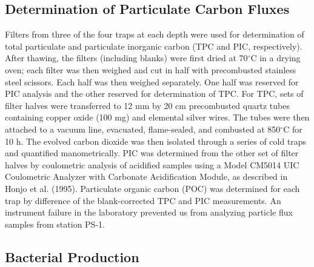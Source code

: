 \subsection{Determination of Particulate Carbon Fluxes}

Filters from three of the four traps at each depth were used for determination of total particulate and particulate inorganic carbon (TPC and PIC, respectively). After thawing, the filters (including blanks) were first dried at 70$^{\circ}$C in a drying oven; each filter was then weighed and cut in half with precombusted stainless steel scissors. Each half was then weighed separately. One half was reserved for PIC analysis and the other reserved for determination of TPC. For TPC, sets of filter halves were transferred to 12 mm by 20 cm precombusted quartz tubes containing copper oxide (100 mg) and elemental silver wires. The tubes were then attached to a vacuum line, evacuated, flame-sealed, and combusted at 850$^{\circ}$C for 10 h. The evolved carbon dioxide was then isolated through a series of cold traps and quantified manometrically. PIC was determined from the other set of filter halves by coulometric analysis of acidified samples using a Model CM5014 UIC Coulometric Analyzer with Carbonate Acidification Module, as described in Honjo et al. (1995). Particulate organic carbon (POC) was determined for each trap by difference of the blank-corrected TPC and PIC measurements. An instrument failure in the laboratory prevented us from analyzing particle flux samples from station PS-1.

\subsection{Bacterial Production}

